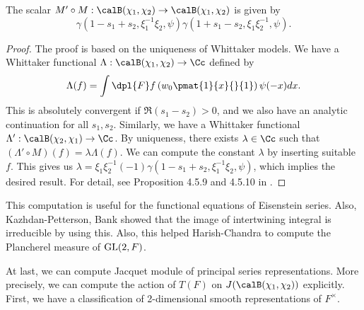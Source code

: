 \begin{proposition}
\label{intcomp}
The scalar $M'\circ M: \calB(\chi_1, \chi_2) \to \calB(\chi_1, \chi_2)$ is given by 
$$
\gamma(1-s_1 + s_2, \xi_{1}^{-1}\xi_{2}, \psi) \gamma(1+s_{1} - s_{2}, \xi_{1}\xi_{2}^{-1}, \psi).
$$
\end{proposition}
\begin{proof}
The proof is based on the uniqueness of Whittaker models. We have a Whittaker functional $\Lambda:\calB(\chi_1, \chi_2)\to \Cc$ defined by 
$$
\Lambda (f) = \int\dpl{F} f\left( w_{0}\pmat{1}{x}{}{1}\right)\psi(-x) dx.
$$
This is absolutely convergent if $\Re(s_1 - s_2) >0$, and we also have an analytic continuation for all $s_1, s_2$. 
Similarly, we have a Whittaker functional $\Lambda' : \calB(\chi_2, \chi_1)\to \Cc$. By uniqueness, there exists $\lambda\in \Cc$ such that $(\Lambda' \circ M)(f) = \lambda\Lambda(f)$. 
We can compute the constant $\lambda$ by inserting suitable $f$. 
This gives us $\lambda = \xi_{1}\xi_{2}^{-1}(-1) \gamma(1-s_1 + s_2, \xi_1^{-1}\xi_2, \psi)$, which implies the desired result. For detail, see Proposition 4.5.9 and 4.5.10 in \cite{bu}. 
\end{proof}
This computation is useful for the functional equations of Eisenstein series. Also, Kazhdan-Petterson, Bank showed that the image of intertwining integral is irreducible by using this. 
Also, this helped Harish-Chandra to compute the Plancherel measure of $\mathrm{GL}(2, F)$. 


At last, we can compute Jacquet module of principal series representations. More precisely, we can compute the action of $T(F)$ on $J(\calB(\chi_1, \chi_2))$ explicitly. 
First, we have a classification of 2-dimensional smooth representations of $F^{\times}$. 

